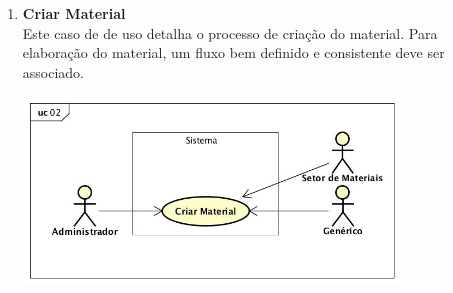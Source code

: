\begin{enumerate}[label=\textbf{UC\protect\twodigits{\theenumi}}, leftmargin=2cm]
\end{enumerate}

\begin{enumerate}[label=\textbf{UC\protect\twodigits{\theenumi}}, leftmargin=2cm]
	\item \textbf{Criar Material} \\
	Este caso de de uso detalha o processo de criação do material. Para elaboração do material, um fluxo bem definido e consistente deve ser associado.  \\
	\begin{minipage}[c]{10cm}
	    \includegraphics[width=10cm]{Imagens/UC_CriarMaterial.jpg}
		\label{fig:uc_criar_material}
	\end{minipage} \\


\end{enumerate}
